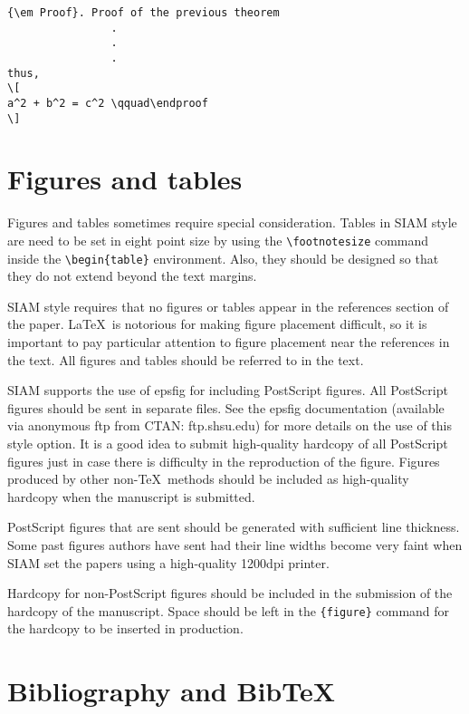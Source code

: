 \documentclass[]{article}
\begin{document}
\begin{verbatim}
{\em Proof}. Proof of the previous theorem 
                .
                .
                .
thus,
\[
a^2 + b^2 = c^2 \qquad\endproof
\]
\end{verbatim}

\section{Figures and tables}\label{figures-and-tables}

Figures and tables sometimes require special consideration. Tables in
SIAM style are need to be set in eight point size by using the
\texttt{\textbackslash{}footnotesize} command inside the
\texttt{\textbackslash{}begin\{table\}} environment. Also, they should
be designed so that they do not extend beyond the text margins.

SIAM style requires that no figures or tables appear in the references
section of the paper. LaTeX~is notorious for making figure placement
difficult, so it is important to pay particular attention to figure
placement near the references in the text. All figures and tables should
be referred to in the text.

SIAM supports the use of {epsfig} for including {PostScript} figures.
All {PostScript} figures should be sent in separate files. See the
{epsfig} documentation (available via anonymous ftp from CTAN:
ftp.shsu.edu) for more details on the use of this style option. It is a
good idea to submit high-quality hardcopy of all {PostScript} figures
just in case there is difficulty in the reproduction of the figure.
Figures produced by other non-TeX~methods should be included as
high-quality hardcopy when the manuscript is submitted.

{PostScript} figures that are sent should be generated with sufficient
line thickness. Some past figures authors have sent had their line
widths become very faint when SIAM set the papers using a high-quality
1200dpi printer.

Hardcopy for non-{PostScript} figures should be included in the
submission of the hardcopy of the manuscript. Space should be left in
the \texttt{\{figure\}} command for the hardcopy to be inserted in
production.

\section{Bibliography and BibTeX}\label{bibliography-and-bibtex}
\end{document}
